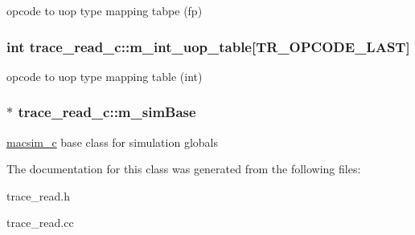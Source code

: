 \label{classtrace__read__c_a71e9a814021a699d19a3b61fdc53d9f4}
opcode to uop type mapping tabpe (fp) \hypertarget{classtrace__read__c_a7ca8b07aa548cbeac42c78fa5dcdc856}{
\subsubsection[{m\_\-int\_\-uop\_\-table}]{\setlength{\rightskip}{0pt plus 5cm}int {\bf trace\_\-read\_\-c::m\_\-int\_\-uop\_\-table}\mbox{[}TR\_\-OPCODE\_\-LAST\mbox{]}}}
\label{classtrace__read__c_a7ca8b07aa548cbeac42c78fa5dcdc856}
opcode to uop type mapping table (int) \hypertarget{classtrace__read__c_a5056a52a94eb0fc5a3ab6e6ccb1d113b}{
\subsubsection[{m\_\-simBase}]{$\ast$ {\bf trace\_\-read\_\-c::m\_\-simBase}}}
\label{classtrace__read__c_a5056a52a94eb0fc5a3ab6e6ccb1d113b}
\hyperlink{classmacsim__c}{macsim\_\-c} base class for simulation globals 

The documentation for this class was generated from the following files:\begin{DoxyCompactItemize}
\item 
trace\_\-read.h\item 
trace\_\-read.cc\end{DoxyCompactItemize}
